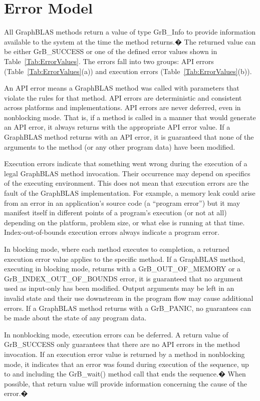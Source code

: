\section{Error Model}
\label{Sec:ErrorModel}

All GraphBLAS methods return a value of type {\sf GrB\_Info} to provide
information available to the system at the time the method returns.� The
returned value can be either {\sf GrB\_SUCCESS} or one of the defined
error values shown in Table~\ref{Tab:ErrorValues}. The errors fall into
two groups: API errors (Table~\ref{Tab:ErrorValues}(a)) and execution
errors (Table~\ref{Tab:ErrorValues}(b)).

An API error means a GraphBLAS method was called with parameters that
violate the rules for that method. API errors are deterministic and
consistent across platforms and implementations.  API errors are never
deferred, even in nonblocking mode. That is, if a method is called in a manner
that would generate an API error, it always returns with the appropriate API error value.  
If a GraphBLAS method returns with an API error, it is guaranteed that none of the
arguments to the method (or any other program data) have been modified.

Execution errors indicate that something went wrong during the execution
of a legal GraphBLAS method invocation.  Their occurrence may depend on
specifics of the executing environment.  This does not mean that execution
errors are the fault of the GraphBLAS implementation.  For example, a
memory leak could arise from an error in an application's source code (a 
``program error'') but it may manifest itself in different
points of a program's execution (or not at all) depending on the platform,
problem size, or what else is running at that time.  Index-out-of-bounds
execution errors always indicate a program error.

In blocking mode, where each method executes to completion, a returned
execution error value applies to the specific method.  If a GraphBLAS
method, executing in blocking mode, returns with a {\sf GrB\_OUT\_OF\_MEMORY} or
a {\sf GrB\_INDEX\_OUT\_OF\_BOUNDS} error, it is guaranteed that no argument
used as input-only has been modified. Output arguments may be left in
an invalid state and their use downstream in the program flow may cause
additional errors.  If a GraphBLAS method returns with a {\sf GrB\_PANIC},
no guarantees can be made about the state of any program data.

In nonblocking mode, execution errors can be deferred.  A return value
of {\sf GrB\_SUCCESS} only guarantees that there are no API errors in the
method invocation.  If an execution error value is returned by a method in
nonblocking mode, it indicates that an error was found during execution
of the sequence, up to and including the {\sf GrB\_wait()} method call
that ends the sequence.� When possible, that return value will provide
information concerning the cause of the error.� 

